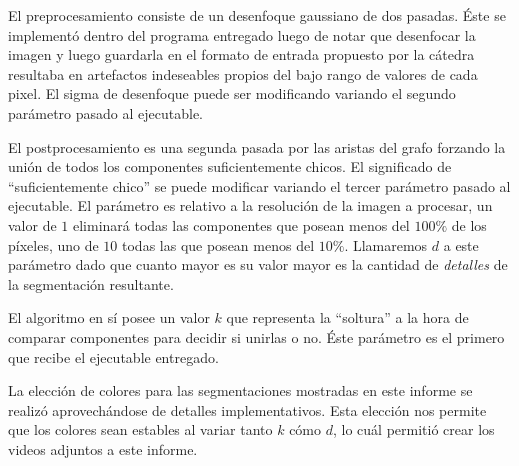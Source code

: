 El preprocesamiento consiste de un desenfoque gaussiano de dos pasadas. Éste se
implementó dentro del programa entregado luego de notar que desenfocar la
imagen y luego guardarla en el formato de entrada propuesto por la cátedra
resultaba en artefactos indeseables propios del bajo rango de valores de cada
pixel. El sigma de desenfoque puede ser modificando variando el segundo
parámetro pasado al ejecutable.

El postprocesamiento es una segunda pasada por las aristas del grafo forzando
la unión de todos los componentes suficientemente chicos. El significado de
``suficientemente chico'' se puede modificar variando el tercer parámetro
pasado al ejecutable. El parámetro es relativo a la resolución de la imagen a
procesar, un valor de $1$ eliminará todas las componentes que posean menos del
$100\%$ de los píxeles, uno de $10$ todas las que posean menos del $10\%$.
Llamaremos $d$ a este parámetro dado que cuanto mayor es su valor mayor es la
cantidad de \emph{detalles} de la segmentación resultante.

El algoritmo en sí posee un valor $k$ que representa la ``soltura'' a la hora
de comparar componentes para decidir si unirlas o no. Éste parámetro es el
primero que recibe el ejecutable entregado.

La elección de colores para las segmentaciones mostradas en este informe se
realizó aprovechándose de detalles implementativos. Esta elección nos permite
que los colores sean estables al variar tanto $k$ cómo $d$, lo cuál permitió
crear los videos adjuntos a este informe.
